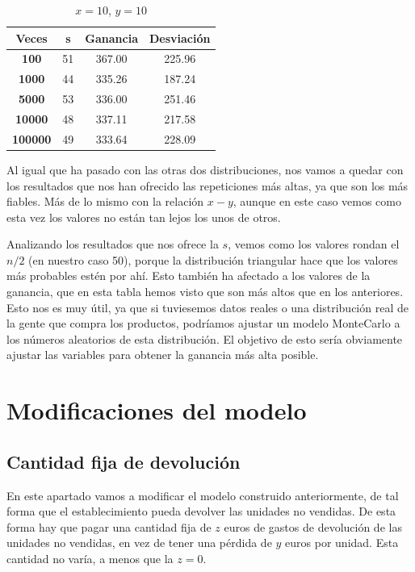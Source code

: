 \documentclass[11pt,a4paper]{report}
\begin{document}
\begin{table}[H]
	\centering
	\begin{tabular}{c|ccc}
	\textbf{Veces} & \textbf{s} & \textbf{Ganancia} & \textbf{Desviación} \\ \hline
	\textbf{100}   & 51         & 367.00            & 225.96			  \\ \hline
	\textbf{1000}  & 44         & 335.26            & 187.24			  \\ \hline
	\textbf{5000}  & 53         & 336.00            & 251.46 			  \\ \hline
	\textbf{10000} & 48         & 337.11            & 217.58			  \\ \hline
	\textbf{100000}& 49         & 333.64            & 228.09			  \\
	\end{tabular}
	\caption{$x=10$, $y=10$}
\end{table}

Al igual que ha pasado con las otras dos distribuciones, nos vamos a quedar con los resultados que nos han ofrecido las repeticiones más altas, ya que
son los más fiables. Más de lo mismo con la relación $x-y$, aunque en este caso vemos como esta vez los valores no están tan lejos los unos de otros.

Analizando los resultados que nos ofrece la $s$, vemos como los valores rondan el $n/2$ (en nuestro caso 50), porque la distribución triangular hace
que los valores más probables estén por ahí. Esto también ha afectado a los valores de la ganancia, que en esta tabla hemos visto que son más altos que
en los anteriores. Esto nos es muy útil, ya que si tuviesemos datos reales o una distribución real de la gente que compra los productos, podríamos ajustar
un modelo MonteCarlo a los números aleatorios de esta distribución. El objetivo de esto sería obviamente ajustar las variables para obtener la ganancia
más alta posible.


\section{Modificaciones del modelo}

\subsection{Cantidad fija de devolución}

En este apartado vamos a modificar el modelo construido anteriormente, de tal forma que el establecimiento pueda devolver las unidades no vendidas. De 
esta forma hay que pagar una cantidad fija de $z$ euros de gastos de devolución de las unidades no vendidas, en vez de tener una pérdida de $y$ euros por
unidad. Esta cantidad no varía, a menos que la $z=0$.
\end{document}

